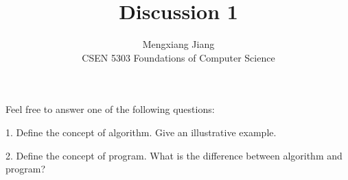 \documentclass[12pt]{article}
\newenvironment{problem}[2][Problem]{\begin{trivlist}
\item[\hskip \labelsep {\bfseries #1}\hskip \labelsep {\bfseries #2.}]}{\end{trivlist}}
\begin{document}
 
 
\title{Discussion 1}%
\author{Mengxiang Jiang\\ %
CSEN 5303 Foundations of Computer Science} %
 
\maketitle
 
\begin{problem}{statement} %
Feel free to answer one of the following questions:

1. Define the concept of algorithm. Give an illustrative example.

2. Define the concept of program. What is the difference between algorithm and program?
\end{problem}
 
\end{document}
